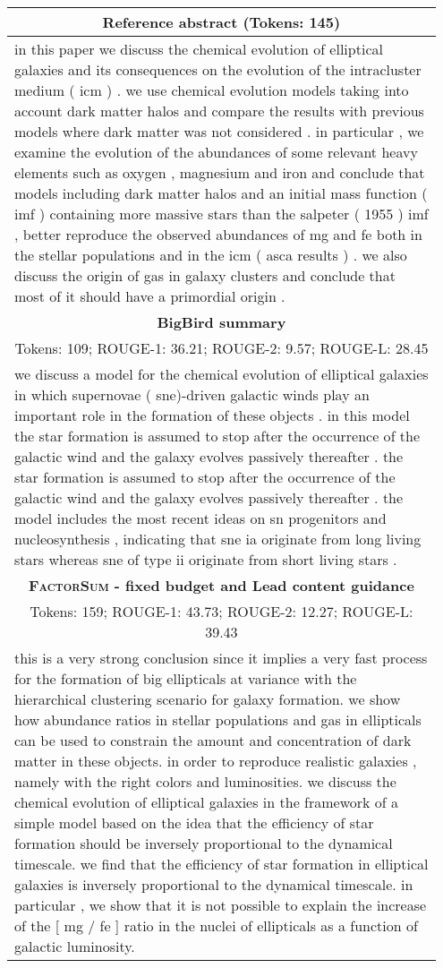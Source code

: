 \documentclass[11pt,table]{article}
\newcommand{\modelname}{FactorSum}
\begin{document}
\begin{table*}[ht]
  \centering
  \begin{tabular}{p{0.95\linewidth}}
    \toprule
    \multicolumn{1}{c}{\textbf{Reference abstract} (Tokens: 145)} \\
    \midrule
    in this paper we discuss the chemical evolution of elliptical galaxies and its consequences on the evolution of the intracluster medium ( icm ) . we use chemical evolution models taking into account dark matter halos and compare the results with previous models where dark matter was not considered . in particular , we examine the evolution of the abundances of some relevant heavy elements such as oxygen , magnesium and iron and conclude that models including dark matter halos and an initial mass function ( imf ) containing more massive stars than the salpeter ( 1955 ) imf , better reproduce the observed abundances of mg and fe both in the stellar populations and in the icm ( asca results ) . we also discuss the origin of gas in galaxy clusters and conclude that most of it should have a primordial origin .\\
    \midrule
    \multicolumn{1}{c}{\textbf{BigBird summary}} \\
    \multicolumn{1}{c}{Tokens: 109; ROUGE-1: 36.21; ROUGE-2: 9.57; ROUGE-L: 28.45} \\
    \midrule
    we discuss a model for the chemical evolution of elliptical galaxies in which supernovae ( sne)-driven galactic winds play an important role in the formation of these objects . in this model  the star formation is assumed to stop after the occurrence of the galactic wind and the galaxy evolves passively thereafter . the star formation is assumed to stop after the occurrence of the galactic wind and the galaxy evolves passively thereafter . the model includes the most recent ideas on sn progenitors and nucleosynthesis , indicating that sne ia originate from long living stars whereas sne of type ii originate from short living stars .\\
    \midrule
    \multicolumn{1}{c}{\textbf{\textsc{\modelname} - fixed budget and Lead content guidance}} \\
    \multicolumn{1}{c}{Tokens: 159; ROUGE-1: 43.73; ROUGE-2: 12.27; ROUGE-L: 39.43} \\
    \midrule
    this is a very strong conclusion since it implies a very fast process for the formation of big ellipticals at variance with the hierarchical clustering scenario for galaxy formation. we show how abundance ratios in stellar populations and gas in ellipticals can be used to constrain the amount and concentration of dark matter in these objects. in order to reproduce realistic galaxies , namely with the right colors and luminosities. we discuss the chemical evolution of elliptical galaxies in the framework of a simple model based on the idea that the efficiency of star formation should be inversely proportional to the dynamical timescale. we find that the efficiency of star formation in elliptical galaxies is inversely proportional to the dynamical timescale. in particular , we show that it is not possible to explain the increase of the [ mg / fe ] ratio in the nuclei of ellipticals as a function of galactic luminosity.\\

\end{tabular}
\end{table*}
\end{document}
